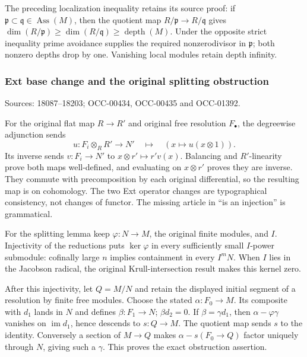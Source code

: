 The preceding localization inequality retains its source proof: if \(\mathfrak p\subset\mathfrak q\in\operatorname{Ass}(M)\), then the quotient map \(R/\mathfrak p\to R/\mathfrak q\) gives \(\dim(R/\mathfrak p)\geq\dim(R/\mathfrak q)\geq\operatorname{depth}(M)\). Under the opposite strict inequality prime avoidance supplies the required nonzerodivisor in \(\mathfrak p\); both nonzero depths drop by one. Vanishing local modules retain depth infinity.

\subsubsection{Ext base change and the original splitting obstruction}\label{ext-base-change-and-the-original-splitting-obstruction}

Sources: 18087--18203; OCC-00434, OCC-00435 and OCC-01392.

For the original flat map \(R\to R'\) and original free resolution \(F_\bullet\), the degreewise adjunction sends \[
u:F_i\otimes_RR'\to N'
\quad\longmapsto\quad (x\mapsto u(x\otimes1)).
\] Its inverse sends \(v:F_i\to N'\) to \(x\otimes r'\mapsto r'v(x)\). Balancing and \(R'\)-linearity prove both maps well-defined, and evaluating on \(x\otimes r'\) proves they are inverse. They commute with precomposition by each original differential, so the resulting map is on cohomology. The two Ext operator changes are typographical consistency, not changes of functor. The missing article in ``is an injection'' is grammatical.

For the splitting lemma keep \(\varphi:N\to M\), the original finite modules, and \(I\). Injectivity of the reductions puts \(\ker\varphi\) in every sufficiently small \(I\)-power submodule: cofinally large \(n\) implies containment in every \(I^mN\). When \(I\) lies in the Jacobson radical, the original Krull-intersection result makes this kernel zero.

After this injectivity, let \(Q=M/N\) and retain the displayed initial segment of a resolution by finite free modules. Choose the stated \(\alpha:F_0\to M\). Its composite with \(d_1\) lands in \(N\) and defines \(\beta:F_1\to N\); \(\beta d_2=0\). If \(\beta=\gamma d_1\), then \(\alpha-\varphi\gamma\) vanishes on \(\operatorname{im}d_1\), hence descends to \(s:Q\to M\). The quotient map sends \(s\) to the identity. Conversely a section of \(M\to Q\) makes \(\alpha-s(F_0\to Q)\) factor uniquely through \(N\), giving such a \(\gamma\). This proves the exact obstruction assertion.

